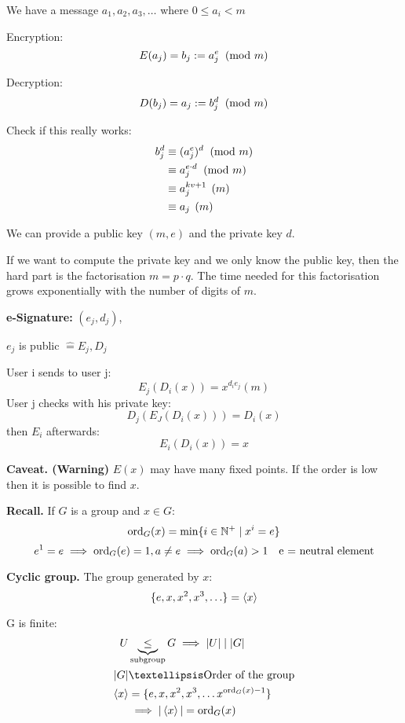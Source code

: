 We have a message $a_1, a_2, a_3, \ldots$ where $0 \leq a_i < m$

Encryption:
\[
  E(a_j) = b_j := a_j^e \imod{m}
\]

Decryption:
\[
  D(b_j) = a_j := b_j^d \imod{m}
\]

Check if this really works:
\begin{align*}
  b_j^d &\equiv (a_j^e)^d \imod{m} \\
    & \equiv a_j^{e \cdot d} \imod{m} \\
    & \equiv a_j^{kv+1} \pod{m} \\
    & \equiv a_j \pod{m} \\
\end{align*}

We can provide a public key $(m,e)$ and the private key $d$.

If we want to compute the private key and we only know the public key, then the hard part is the factorisation $m = p \cdot q$. The time needed for this factorisation grows exponentially with the number of digits of $m$.

\textbf{e-Signature: }
$(e_j,d_j)$,

$e_j$ is public $\hat{=} E_j, D_j$

User i sends to user j:
\[
  E_j(D_i(x)) = x^{d_i e_j} (m)
\]
User j checks with his private key:
\[
  D_j (E_J(D_i(x))) = D_i(x)
\]
then $E_i$ afterwards:
\[
  E_i(D_i(x)) = x
\]

\textbf{Caveat. (Warning)}
$E(x)$ may have many fixed points.
If the order is low then it is possible to find $x$.

\textbf{Recall.}
If $G$ is a group and $x\in G$:
\[
  \operatorname{ord}_G(x) = \min\{ i\in \mathbb{N}^{+} \mid x^i = e \}
\]
\[
  e^1 = e \implies \operatorname{ord}_G(e) = 1, a \neq e \implies \operatorname{ord}_G(a) > 1 \quad \text{e = neutral element}
\]

\textbf{Cyclic group.}
The group generated by $x$:
\[
  \{ e, x, x^2, x^3, \ldots \} = \left\langle x \right\rangle
\]

G is finite:
\begin{align*}
  U & \underbrace{\leq}_{\text{subgroup}}  G \implies |U| \mid |G|\\
  |G| & …\text{Order of the group}\\
      \GroupGenBy{x} &= \{ e, x, x^2, x^3, \ldots x^{\ord_G(x) -1}\} \\
    & \implies |\GroupGenBy{x}| = \ord_G(x)\\
\end{align*}

